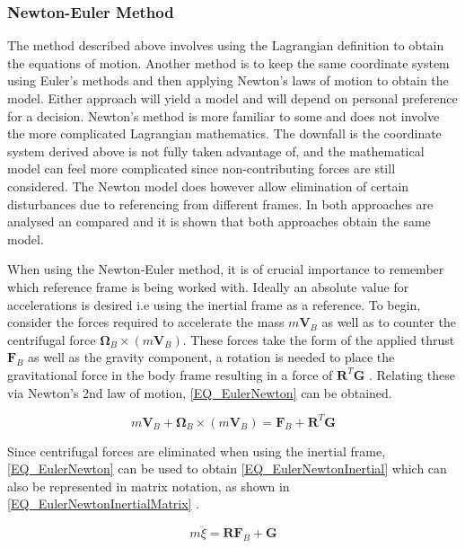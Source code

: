 		\subsubsection{Newton-Euler Method}
		The method described above involves using the Lagrangian definition to obtain the equations of motion. Another method is to keep the same coordinate system using Euler's methods and then applying Newton's laws of motion to obtain the model. Either approach will yield a model and will depend on personal preference for a decision. Newton's method is more familiar to some and does not involve the more complicated Lagrangian mathematics. The downfall is the coordinate system derived above is not fully taken advantage of, and the mathematical model can feel more complicated since non-contributing forces are still considered. The Newton model does however allow elimination of certain disturbances due to referencing from different frames. 
		In \cite{Luukkonen, Modelling} both approaches are analysed an compared and it is shown that both approaches obtain the same model.
		
		When using the Newton-Euler method, it is of crucial importance to remember which reference frame is being worked with. Ideally an absolute value for accelerations is desired i.e using the inertial frame as a reference. To begin, consider the forces required to accelerate the mass $m\textbf{V}_B$ as well as to counter the centrifugal force $\boldsymbol{\Omega}_B \times (m\textbf{V}_B)$. These forces take the form of the applied thrust $\textbf{F}_B$ as well as the gravity component, a rotation is needed to place the gravitational force in the body frame resulting in a force of $\textbf{R}^T \textbf{G}$ \cite{Luukkonen}. Relating these via Newton's 2nd law of motion, \eqref{EQ_EulerNewton} can be obtained.
		
		\begin{equation}
		m\textbf{V}_B + \boldsymbol{\Omega}_B \times (m\textbf{V}_B) = \textbf{F}_B + \textbf{R}^T \textbf{G}
		\label{EQ_EulerNewton}
		\end{equation}
		
		Since centrifugal forces are eliminated when using the inertial frame, \eqref{EQ_EulerNewton} can be used to obtain  \eqref{EQ_EulerNewtonInertial} which can also be represented in matrix notation, as shown in \eqref{EQ_EulerNewtonInertialMatrix} \cite{Luukkonen}. 
		
		\begin{equation}
		m\ddot{\xi}  = \textbf{R}\textbf{F}_B + \textbf{G}
		\label{EQ_EulerNewtonInertial}
		\end{equation}
		
